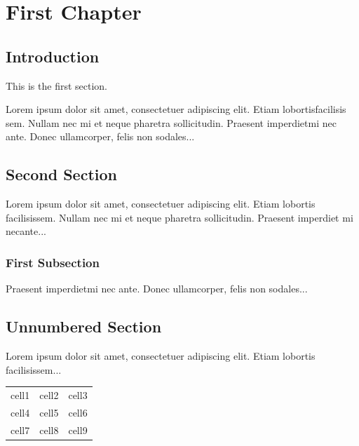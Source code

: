 \documentclass[12pt, letterpaper]{book}
\begin{document}
	\chapter{First Chapter}
	
	\section{Introduction}
	
	This is the first section.
	
	Lorem  ipsum  dolor  sit  amet,  consectetuer  adipiscing  
	elit. Etiam  lobortisfacilisis sem.  Nullam nec mi et 
	neque pharetra sollicitudin.  Praesent imperdietmi nec ante. 
	Donec ullamcorper, felis non sodales...
	
	\section{Second Section}
	
	Lorem ipsum dolor sit amet, consectetuer adipiscing elit.  
	Etiam lobortis facilisissem.  Nullam nec mi et neque pharetra 
	sollicitudin.  Praesent imperdiet mi necante...
	
	\subsection{First Subsection}
	Praesent imperdietmi nec ante. Donec ullamcorper, felis non sodales...
	
	\section*{Unnumbered Section}
	Lorem ipsum dolor sit amet, consectetuer adipiscing elit.  
	Etiam lobortis facilisissem...
	
	\begin{center}
		\begin{tabular}{c c c}
			cell1 & cell2 & cell3 \\ 
			cell4 & cell5 & cell6 \\  
			cell7 & cell8 & cell9    
		\end{tabular}
	\end{center}
\end{document}
